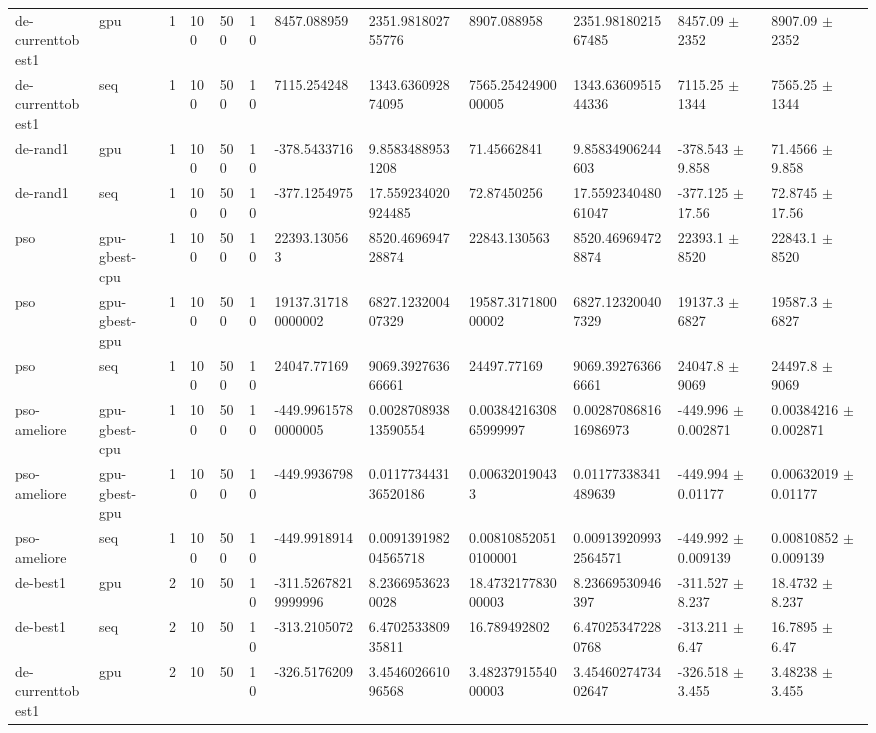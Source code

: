 \begin{table}[t]
\begin{tabular}{llllllllllll}
de-currenttobest1 & gpu & 1 & 100 & 500 & 10 & 8457.088959 & 2351.981802755776 & 8907.088958 & 2351.9818021567485 & 8457.09 $\pm$ 2352 & 8907.09 $\pm$ 2352 \\
de-currenttobest1 & seq & 1 & 100 & 500 & 10 & 7115.254248 & 1343.636092874095 & 7565.2542490000005 & 1343.6360951544336 & 7115.25 $\pm$ 1344 & 7565.25 $\pm$ 1344 \\
de-rand1 & gpu & 1 & 100 & 500 & 10 & -378.5433716 & 9.85834889531208 & 71.45662841 & 9.85834906244603 & -378.543 $\pm$ 9.858 & 71.4566 $\pm$ 9.858 \\
de-rand1 & seq & 1 & 100 & 500 & 10 & -377.1254975 & 17.559234020924485 & 72.87450256 & 17.559234048061047 & -377.125 $\pm$ 17.56 & 72.8745 $\pm$ 17.56 \\
pso & gpu-gbest-cpu & 1 & 100 & 500 & 10 & 22393.130563 & 8520.469694728874 & 22843.130563 & 8520.469694728874 & 22393.1 $\pm$ 8520 & 22843.1 $\pm$ 8520 \\
pso & gpu-gbest-gpu & 1 & 100 & 500 & 10 & 19137.317180000002 & 6827.123200407329 & 19587.317180000002 & 6827.123200407329 & 19137.3 $\pm$ 6827 & 19587.3 $\pm$ 6827 \\
pso & seq & 1 & 100 & 500 & 10 & 24047.77169 & 9069.392763666661 & 24497.77169 & 9069.392763666661 & 24047.8 $\pm$ 9069 & 24497.8 $\pm$ 9069 \\
pso-ameliore & gpu-gbest-cpu & 1 & 100 & 500 & 10 & -449.99615780000005 & 0.002870893813590554 & 0.0038421630865999997 & 0.0028708681616986973 & -449.996 $\pm$ 0.002871 & 0.00384216 $\pm$ 0.002871 \\
pso-ameliore & gpu-gbest-gpu & 1 & 100 & 500 & 10 & -449.9936798 & 0.011773443136520186 & 0.006320190433 & 0.01177338341489639 & -449.994 $\pm$ 0.01177 & 0.00632019 $\pm$ 0.01177 \\
pso-ameliore & seq & 1 & 100 & 500 & 10 & -449.9918914 & 0.009139198204565718 & 0.008108520510100001 & 0.009139209932564571 & -449.992 $\pm$ 0.009139 & 0.00810852 $\pm$ 0.009139 \\
de-best1 & gpu & 2 & 10 & 50 & 10 & -311.52678219999996 & 8.23669536230028 & 18.473217783000003 & 8.23669530946397 & -311.527 $\pm$ 8.237 & 18.4732 $\pm$ 8.237 \\
de-best1 & seq & 2 & 10 & 50 & 10 & -313.2105072 & 6.470253380935811 & 16.789492802 & 6.470253472280768 & -313.211 $\pm$ 6.47 & 16.7895 $\pm$ 6.47 \\
de-currenttobest1 & gpu & 2 & 10 & 50 & 10 & -326.5176209 & 3.454602661096568 & 3.4823791554000003 & 3.4546027473402647 & -326.518 $\pm$ 3.455 & 3.48238 $\pm$ 3.455 \\

\end{tabular}
\end{table}
